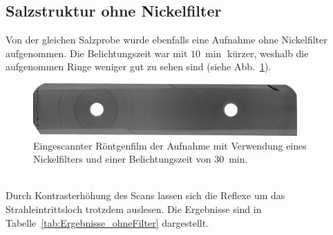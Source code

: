\documentclass[a4paper,twoside,final]{article}
\begin{document}
\subsection{Salzstruktur ohne Nickelfilter}
Von der gleichen Salzprobe wurde ebenfalls eine Aufnahme ohne Nickelfilter aufgenommen. Die Belichtungszeit war mit $\SI{10}{\min}$ kürzer, weshalb die aufgenommen Ringe weniger gut zu sehen sind (siehe Abb.~\ref{fig:Film_ohneFilter}).
\begin{figure}[htp]
    \centering
        \includegraphics[width=0.9\textwidth]{Abbildungen/Roentgenfilm_ohne_Filter.jpg}
    \caption{Eingescannter Röntgenfilm der Aufnahme mit Verwendung eines Nickelfilters und einer Belichtungszeit von \SI{30}{\minute}.}
    \label{fig:Film_ohneFilter}
\end{figure}\\
Durch Kontrasterhöhung des Scans lassen sich die Reflexe um das Strahleintrittsloch trotzdem auslesen. Die Ergebnisse sind in Tabelle~\ref{tab:Ergebnisse_ohneFilter} dargestellt.
\end{document}
